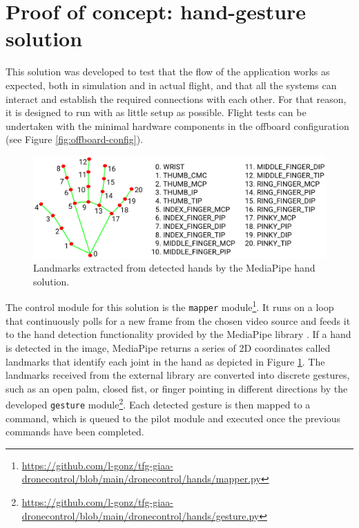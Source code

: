 \section{Proof of concept: hand-gesture solution}
\label{sec:hands}
This solution was developed to test that the flow of the application works as expected, both in simulation and in actual flight, and that all the systems can interact and establish the required connections with each other.
For that reason, it is designed to run with as little setup as possible. Flight tests can be undertaken with the minimal hardware components in the offboard configuration (see Figure \ref{fig:offboard-config}).

\begin{figure}[H]
  \centering
  \includegraphics[width=\textwidth, keepaspectratio]{img/hand_landmarks.png}
  \caption{Landmarks extracted from detected hands by the MediaPipe hand solution.}
  \label{fig:hand-landmarks}
\end{figure}

The control module for this solution is the \texttt{mapper} module\footnote{\url{https://github.com/l-gonz/tfg-giaa-dronecontrol/blob/main/dronecontrol/hands/mapper.py}}.
It runs on a loop that continuously polls for a new frame from the chosen video source and feeds it to the hand detection functionality provided by the MediaPipe library \cite{mp-hands-paper}. If a hand is detected in the image, MediaPipe returns a series of 2D coordinates called landmarks that identify each joint in the hand as depicted in Figure \ref{fig:hand-landmarks}.
The landmarks received from the external library are converted into discrete gestures, such as an open palm, closed fist, or finger pointing in different directions by the developed \texttt{gesture} module\footnote{\url{https://github.com/l-gonz/tfg-giaa-dronecontrol/blob/main/dronecontrol/hands/gesture.py}}. Each detected gesture is then mapped to a command, which is queued to the pilot module and executed once the previous commands have been completed.

